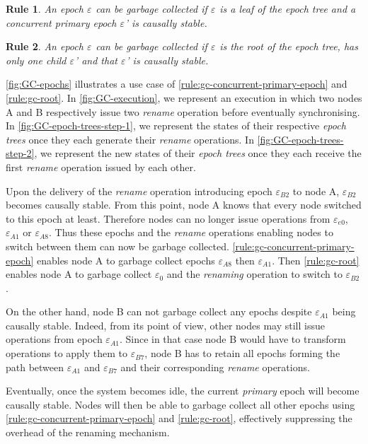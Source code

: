 \documentclass[sigplan,10pt]{acmart}
\newtheorem{myrule}{Rule}
\newcommand{\epoch}[1]{$\varepsilon_{#1}$}
\begin{document}
\begin{myrule}
    \label{rule:gc-concurrent-primary-epoch}
    An epoch \epoch{} can be garbage collected if \epoch{} is a leaf of the epoch tree and a concurrent primary epoch \epoch{}' is causally stable.
\end{myrule}

\begin{myrule}
    \label{rule:gc-root}
    An epoch \epoch{} can be garbage collected if \epoch{} is the root of the epoch tree, has only one child \epoch{}' and that \epoch{}' is causally stable.
\end{myrule}

\autoref{fig:GC-epochs} illustrates a use case of \autoref{rule:gc-concurrent-primary-epoch} and \autoref{rule:gc-root}.
In \autoref{fig:GC-execution}, we represent an execution in which two nodes A and B respectively issue two \emph{rename} operation before eventually synchronising.
In \autoref{fig:GC-epoch-trees-step-1}, we represent the states of their respective \emph{epoch trees} once they each generate their \emph{rename} operations.
In \autoref{fig:GC-epoch-trees-step-2}, we represent the new states of their \emph{epoch trees} once they each receive the first \emph{rename} operation issued by each other.

Upon the delivery of the \emph{rename} operation introducing epoch \epoch{B2} to node A, \epoch{B2} becomes causally stable.
From this point, node A knows that every node switched to this epoch at least.
Therefore nodes can no longer issue operations from \epoch{e0}, \epoch{A1} or \epoch{A8}.
Thus these epochs and the \emph{rename} operations enabling nodes to switch between them can now be garbage collected.
\autoref{rule:gc-concurrent-primary-epoch} enables node A to garbage collect epochs \epoch{A8} then \epoch{A1}.
Then \autoref{rule:gc-root} enables node A to garbage collect \epoch{0} and the \emph{renaming} operation to switch to \epoch{B2}.

On the other hand, node B can not garbage collect any epochs despite \epoch{A1} being causally stable.
Indeed, from its point of view, other nodes may still issue operations from epoch \epoch{A1}.
Since in that case node B would have to transform operations to apply them to \epoch{B7}, node B has to retain all epochs forming the path between \epoch{A1} and \epoch{B7} and their corresponding \emph{rename} operations.

Eventually, once the system becomes idle, the current \emph{primary} epoch will become causally stable.
Nodes will then be able to garbage collect all other epochs using \autoref{rule:gc-concurrent-primary-epoch} and \autoref{rule:gc-root}, effectively suppressing the overhead of the renaming mechanism.
\end{document}
